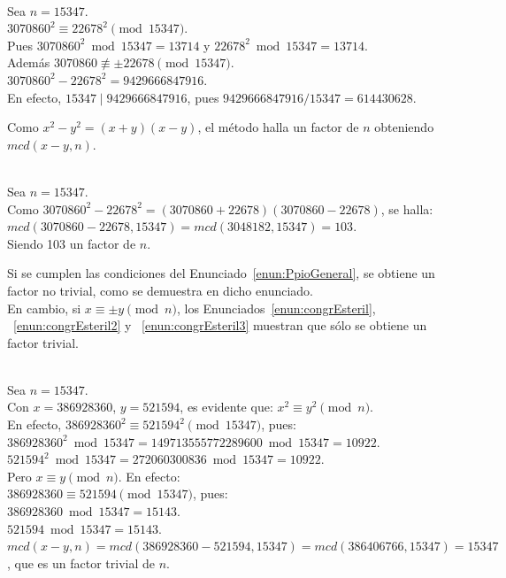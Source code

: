 \begin{ejemplo} \, \\
Sea $n=15347$. \\
$3070860^2 \equiv 22678^2 \pmod {15347}$. \\
Pues $3070860^2 \bmod 15347 = 13714$ y $22678^2 \bmod 15347 = 13714$. \\
Además $3070860 \nequiv \pm 22678 \pmod {15347}$. \\
$3070860^2 - 22678^2 = 9429666847916$. \\
En efecto, $15347 \mid 9429666847916$, pues $9429666847916/15347 = 614430628$. \\
\end{ejemplo}

Como $x^2 - y^2 = (x+y)(x-y)$, el método halla un factor de $n$ obteniendo $mcd(x-y,n)$.

\begin{ejemplo}  \, \\
Sea $n=15347$. \\
Como $3070860^2 - 22678^2 = (3070860 + 22678)(3070860 - 22678)$, se halla: \\
$mcd(3070860 - 22678,15347) =  mcd(3048182,15347) = 103$. \\
Siendo 103 un factor de $n$.
\end{ejemplo}

Si se cumplen las condiciones del Enunciado~\ref{enun:PpioGeneral}, se obtiene un factor no trivial, como se demuestra en dicho enunciado. \\
En cambio, si $x \equiv \pm y \pmod n$, los Enunciados~\ref{enun:congrEsteril}, ~\ref{enun:congrEsteril2} y ~\ref{enun:congrEsteril3} muestran que sólo se obtiene un factor trivial.

\begin{ejemplo} \, \\
Sea $n=15347$. \\
Con $x=386928360$, $y=521594$, es evidente que: $x^2 \equiv y^2 \pmod n$. \\
En efecto, $386928360^2 \equiv 521594^2 \pmod {15347}$, pues: \\
$386928360^2 \bmod 15347 = 149713555772289600 \bmod 15347 = 10922$. \\
$521594^2 \bmod 15347 = 272060300836 \bmod 15347 = 10922$. \\
Pero  $x \equiv y \pmod n$. En efecto: \\
$386928360 \equiv 521594 \pmod {15347}$, pues: \\
$386928360 \bmod 15347 = 15143$. \\
$521594 \bmod 15347 = 15143$. \\
$mcd(x-y,n) = mcd(386928360-521594,15347) = mcd(386406766,15347) = 15347$, que es un factor trivial de $n$. 
\end{ejemplo}

